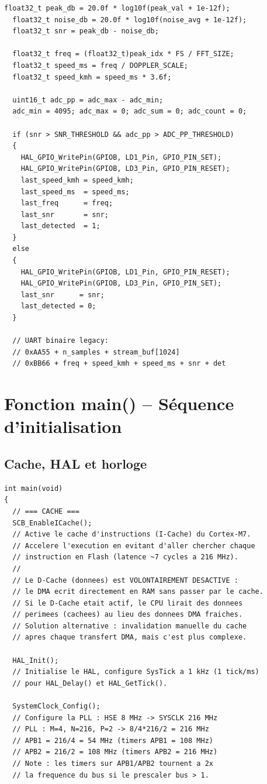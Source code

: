 \documentclass[a4paper,11pt]{article}
\begin{document}
\begin{lstlisting}[style=cstyle,caption={D\'ecision de d\'etection + sorties UART/OLED/LED}]
  float32_t peak_db = 20.0f * log10f(peak_val + 1e-12f);
  float32_t noise_db = 20.0f * log10f(noise_avg + 1e-12f);
  float32_t snr = peak_db - noise_db;

  float32_t freq = (float32_t)peak_idx * FS / FFT_SIZE;
  float32_t speed_ms = freq / DOPPLER_SCALE;
  float32_t speed_kmh = speed_ms * 3.6f;

  uint16_t adc_pp = adc_max - adc_min;
  adc_min = 4095; adc_max = 0; adc_sum = 0; adc_count = 0;

  if (snr > SNR_THRESHOLD && adc_pp > ADC_PP_THRESHOLD)
  {
    HAL_GPIO_WritePin(GPIOB, LD1_Pin, GPIO_PIN_SET);
    HAL_GPIO_WritePin(GPIOB, LD3_Pin, GPIO_PIN_RESET);
    last_speed_kmh = speed_kmh;
    last_speed_ms  = speed_ms;
    last_freq      = freq;
    last_snr       = snr;
    last_detected  = 1;
  }
  else
  {
    HAL_GPIO_WritePin(GPIOB, LD1_Pin, GPIO_PIN_RESET);
    HAL_GPIO_WritePin(GPIOB, LD3_Pin, GPIO_PIN_SET);
    last_snr      = snr;
    last_detected = 0;
  }

  // UART binaire legacy:
  // 0xAA55 + n_samples + stream_buf[1024]
  // 0xBB66 + freq + speed_kmh + speed_ms + snr + det
\end{lstlisting}

\newpage

\section{Fonction main() -- S\'equence d'initialisation}

\subsection{Cache, HAL et horloge}

\begin{lstlisting}[style=cstyle,caption={D\'emarrage du syst\`eme}]
int main(void)
{
  // === CACHE ===
  SCB_EnableICache();
  // Active le cache d'instructions (I-Cache) du Cortex-M7.
  // Accelere l'execution en evitant d'aller chercher chaque
  // instruction en Flash (latence ~7 cycles a 216 MHz).
  //
  // Le D-Cache (donnees) est VOLONTAIREMENT DESACTIVE :
  // le DMA ecrit directement en RAM sans passer par le cache.
  // Si le D-Cache etait actif, le CPU lirait des donnees
  // perimees (cachees) au lieu des donnees DMA fraiches.
  // Solution alternative : invalidation manuelle du cache
  // apres chaque transfert DMA, mais c'est plus complexe.

  HAL_Init();
  // Initialise le HAL, configure SysTick a 1 kHz (1 tick/ms)
  // pour HAL_Delay() et HAL_GetTick().

  SystemClock_Config();
  // Configure la PLL : HSE 8 MHz -> SYSCLK 216 MHz
  // PLL : M=4, N=216, P=2 -> 8/4*216/2 = 216 MHz
  // APB1 = 216/4 = 54 MHz (timers APB1 = 108 MHz)
  // APB2 = 216/2 = 108 MHz (timers APB2 = 216 MHz)
  // Note : les timers sur APB1/APB2 tournent a 2x
  // la frequence du bus si le prescaler bus > 1.
\end{lstlisting}
\end{document}
